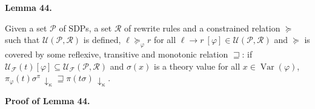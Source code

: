 \documentclass[10pt,a4paper]{amsart}
\begin{document}
 
 
\par\medskip\noindent\textbf{Lemma 44.}\par
 
 
Given a set $\mathcal{P}$ of SDPs, a set $\mathcal{R}$ of rewrite rules and a constrained relation $\succeq$ such that $\mathcal{U}(\mathcal{P},\mathcal{R})$ is defined, ${\ell}\mathrel{\succeq}_{\varphi}{r}$ for all ${\ell}\rightarrow{r}\ [\varphi]\in\mathcal{U}(\mathcal{P},\mathcal{R})$ and $\succeq$ is covered by some reflexive, transitive and monotonic relation $\sqsupseteq$: if $\mathcal{U}_{\mathcal{F}}(t)[\varphi]\subseteq\mathcal{U}_{\mathcal{F}}(\mathcal{P},\mathcal{R})$ and $\sigma(x)$ is a theory value for all $x\in\operatorname{Var}(\varphi)$, $\pi_{\varphi}(t)\sigma^{\pi}\,{\downarrow}_{\kappa}\sqsupseteq\pi(t\sigma)\,{\downarrow}_{\kappa}$.\par
 
 
 
 
 
\par\medskip\noindent\textbf{Proof of Lemma 44.}\par
 
 
\end{document}

